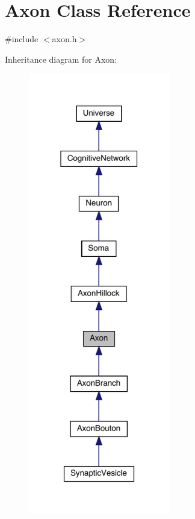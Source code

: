 \hypertarget{class_axon}{}\section{Axon Class Reference}
\label{class_axon}


{\ttfamily \#include $<$axon.\+h$>$}



Inheritance diagram for Axon\+:\nopagebreak
\begin{figure}[H]
\begin{center}
\leavevmode
\includegraphics[width=175pt]{class_axon__inherit__graph}
\end{center}
\end{figure}



